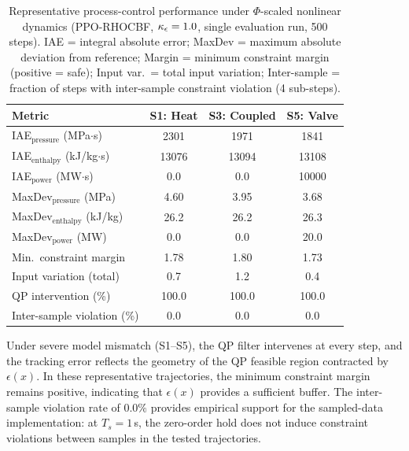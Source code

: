 \begin{table}[htbp]
    \centering
    \caption{Representative process-control performance under $\Phi$-scaled nonlinear dynamics (PPO-RHOCBF, $\kappa_\epsilon=1.0$, single evaluation run, 500 steps). IAE = integral absolute error; MaxDev = maximum absolute deviation from reference; Margin = minimum constraint margin (positive = safe); Input var.\ = total input variation; Inter-sample = fraction of steps with inter-sample constraint violation (4 sub-steps).}
    \label{tab:process_metrics}
    \footnotesize
    \begin{tabular}{lccc}
        \toprule
        Metric & S1: Heat & S3: Coupled & S5: Valve \\
        \midrule
        IAE$_{\mathrm{pressure}}$ (MPa$\cdot$s)  & 2301 & 1971 & 1841 \\
        IAE$_{\mathrm{enthalpy}}$ (kJ/kg$\cdot$s) & 13076 & 13094 & 13108 \\
        IAE$_{\mathrm{power}}$ (MW$\cdot$s)       & 0.0 & 0.0 & 10000 \\
        MaxDev$_{\mathrm{pressure}}$ (MPa)        & 4.60 & 3.95 & 3.68 \\
        MaxDev$_{\mathrm{enthalpy}}$ (kJ/kg)      & 26.2 & 26.2 & 26.3 \\
        MaxDev$_{\mathrm{power}}$ (MW)            & 0.0 & 0.0 & 20.0 \\
        Min.\ constraint margin                   & 1.78 & 1.80 & 1.73 \\
        Input variation (total)                   & 0.7 & 1.2 & 0.4 \\
        QP intervention (\%)                       & 100.0 & 100.0 & 100.0 \\
        Inter-sample violation (\%)               & 0.0 & 0.0 & 0.0 \\
        \bottomrule
    \end{tabular}
\end{table}

Under severe model mismatch (S1--S5), the QP filter intervenes at every step, and the tracking error reflects the geometry of the QP feasible region contracted by $\epsilon(x)$. In these representative trajectories, the minimum constraint margin remains positive, indicating that $\epsilon(x)$ provides a sufficient buffer. The inter-sample violation rate of $0.0\%$ provides empirical support for the sampled-data implementation: at $T_s = 1$\,s, the zero-order hold does not induce constraint violations between samples in the tested trajectories.

